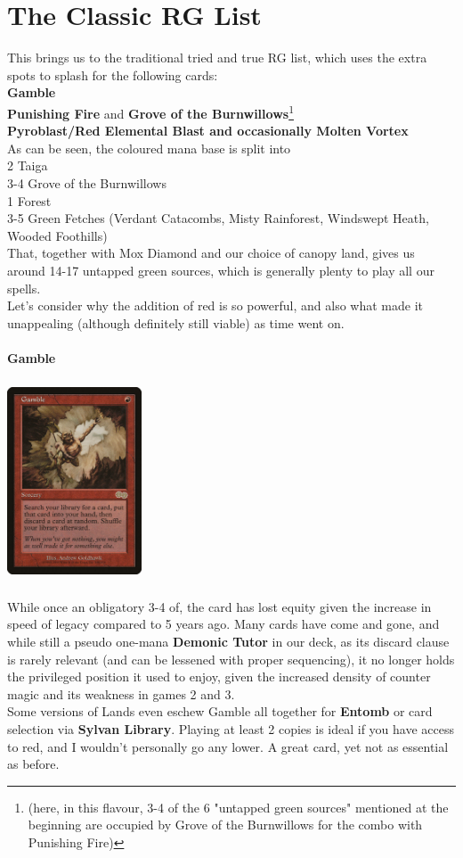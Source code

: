 \documentclass{report}
\begin{document}
\chapter{The Classic RG List}
This brings us to the traditional tried and true RG list, which uses the extra spots to splash for the following cards:\\
\textbf{Gamble\\}
\textbf{Punishing Fire} and \textbf{Grove of the Burnwillows}\footnote{(here, in this flavour, 3-4 of the 6 "untapped green sources" mentioned at the beginning are occupied by Grove of the Burnwillows for the combo with Punishing Fire)}\\
\textbf{Pyroblast/Red Elemental Blast and occasionally Molten Vortex\\}
As can be seen, the coloured mana base is split into\\
2 Taiga\\
3-4 Grove of the Burnwillows\\
1 Forest\\
3-5 Green Fetches (Verdant Catacombs, Misty Rainforest, Windswept Heath, Wooded Foothills)\\
That, together with Mox Diamond and our choice of canopy land, gives us around 14-17 untapped green sources, which is generally plenty to play all our spells.\\
Let's consider why the addition of red is so powerful, and also what made it unappealing (although definitely still viable) as time went on.\\\\
\newpage
\textbf{Gamble\\}
\begin{center}
\includegraphics [width = 4cm, height = 6cm] {gamble}
\end{center}
While once an obligatory 3-4 of, the card has lost equity given the increase in speed of legacy compared to 5 years ago. Many cards have come and gone, and while still a pseudo one-mana \textbf{Demonic Tutor} in our deck, as its discard clause is rarely relevant (and can be lessened with proper sequencing), it no longer holds the privileged position it used to enjoy, given the increased density of counter magic and its weakness in games 2 and 3.\\Some versions of Lands even eschew Gamble all together for \textbf{Entomb} or card selection via \textbf{Sylvan Library}. Playing at least 2 copies is ideal if you have access to red, and I wouldn't personally go any lower. A great card, yet not as essential as before. \\
\end{document}
